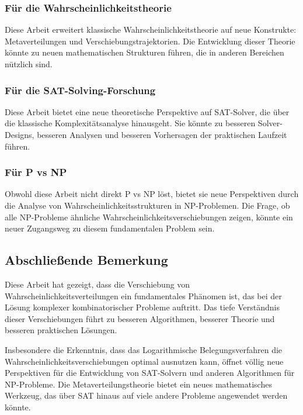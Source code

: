 ﻿\documentclass[a4paper,12pt]{article}
\theoremstyle{definition}
\begin{document}
\subsubsection{Für die Wahrscheinlichkeitstheorie}

Diese Arbeit erweitert klassische Wahrscheinlichkeitstheorie auf neue Konstrukte: Metaverteilungen und Verschiebungstrajektorien. Die Entwicklung dieser Theorie könnte zu neuen mathematischen Strukturen führen, die in anderen Bereichen nützlich sind.

\subsubsection{Für die SAT-Solving-Forschung}

Diese Arbeit bietet eine neue theoretische Perspektive auf SAT-Solver, die über die klassische Komplexitätsanalyse hinausgeht. Sie könnte zu besseren Solver-Designs, besseren Analysen und besseren Vorhersagen der praktischen Laufzeit führen.

\subsubsection{Für P vs NP}

Obwohl diese Arbeit nicht direkt P vs NP löst, bietet sie neue Perspektiven durch die Analyse von Wahrscheinlichkeitsstrukturen in NP-Problemen. Die Frage, ob alle NP-Probleme ähnliche Wahrscheinlichkeitsverschiebungen zeigen, könnte ein neuer Zugangsweg zu diesem fundamentalen Problem sein.

\subsection{Abschließende Bemerkung}

Diese Arbeit hat gezeigt, dass die Verschiebung von Wahrscheinlichkeitsverteilungen ein fundamentales Phänomen ist, das bei der Lösung komplexer kombinatorischer Probleme auftritt. Das tiefe Verständnis dieser Verschiebungen führt zu besseren Algorithmen, besserer Theorie und besseren praktischen Lösungen.

Insbesondere die Erkenntnis, dass das Logarithmische Belegungsverfahren die Wahrscheinlichkeitsverschiebungen optimal ausnutzen kann, öffnet völlig neue Perspektiven für die Entwicklung von SAT-Solvern und anderen Algorithmen für NP-Probleme. Die Metaverteilungstheorie bietet ein neues mathematisches Werkzeug, das über SAT hinaus auf viele andere Probleme angewendet werden könnte.
\end{document}
